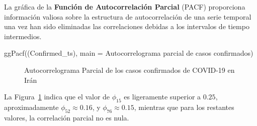\documentclass[
  letterpaper,
  DIV=11,
  numbers=noendperiod]{scrreport}
\newenvironment{Shaded}{\begin{snugshade}}{\end{snugshade}}
\newcommand{\AttributeTok}[1]{\textcolor[rgb]{0.40,0.45,0.13}{#1}}
\newcommand{\FunctionTok}[1]{\textcolor[rgb]{0.28,0.35,0.67}{#1}}
\newcommand{\NormalTok}[1]{\textcolor[rgb]{0.00,0.23,0.31}{#1}}
\newcommand{\StringTok}[1]{\textcolor[rgb]{0.13,0.47,0.30}{#1}}
\theoremstyle{plain}
\theoremstyle{definition}
\theoremstyle{definition}
\theoremstyle{plain}
\theoremstyle{remark}
\begin{document}
La gráfica de la \textbf{Función de Autocorrelación Parcial} (PACF)
proporciona información valiosa sobre la estructura de autocorrelación
de una serie temporal una vez han sido eliminadas las correlaciones
debidas a los intervalos de tiempo intermedios.

\begin{Shaded}
\begin{Highlighting}[]
\FunctionTok{ggPacf}\NormalTok{((Confirmed\_ts), }\AttributeTok{main =} \StringTok{\textquotesingle{}Autocorrelograma parcial de casos confirmados\textquotesingle{}}\NormalTok{)}
\end{Highlighting}
\end{Shaded}

\begin{figure}


\caption{\label{fig-pacf}Autocorrelograma Parcial de los casos
confirmados de COVID-19 en Irán}

\end{figure}%

La Figura~\ref{fig-pacf} indica que el valor de \(\phi_{15}\) es
ligeramente superior a \(0.25\), aproximadamente
\(\phi_{52}\approx 0.16\), y \(\phi_{76}\approx 0.15\), mientras que
para los restantes valores, la correlación parcial no es nula.
\end{document}
